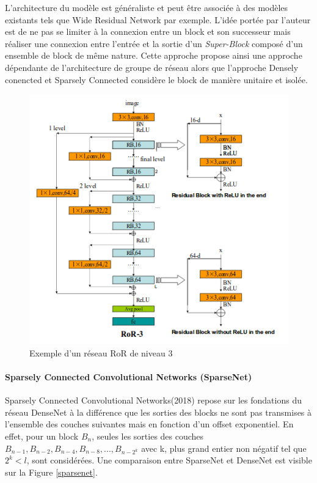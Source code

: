 \noindent L'architecture du modèle est généraliste et peut être associée à des modèles existants tels que Wide Residual Network par exemple. L'idée portée par l'auteur est de ne pas se limiter à la connexion entre un block et son successeur mais réaliser une connexion entre l'entrée et la sortie d'un \textit{Super-Block} composé d'un ensemble de block de même nature. Cette approche propose ainsi une approche dépendante de l'architecture de groupe de réseau alors que l'approche Densely conencted et Sparsely Connected considère le block de manière unitaire et isolée.

\begin{figure}
    \centering
    \includegraphics[scale=0.4]{./tex/convolution-network/classifier/ror.png}
    \caption{Exemple d'un réseau RoR de niveau 3}
    \label{ror}
\end{figure}

\paragraph{Sparsely Connected Convolutional Networks (SparseNet)}

Sparsely Connected Convolutional Networks\cite{sparsenet}(2018) repose sur les fondations du réseau DenseNet à la différence que les sorties des blocks ne sont pas transmises à l'ensemble des couches suivantes mais en fonction d'un offset exponentiel. En effet, pour un block $B_n$, seules les sorties des couches $B_{n-1}, B_{n-2},B_{n-4}, B_{n-8},...,B_{n-2^k}$ avec k, plus grand entier non négatif tel que $2^k<l$, sont considérées. Une comparaison entre SparseNet et DenseNet est visible sur la Figure \ref{sparsenet}.\\

